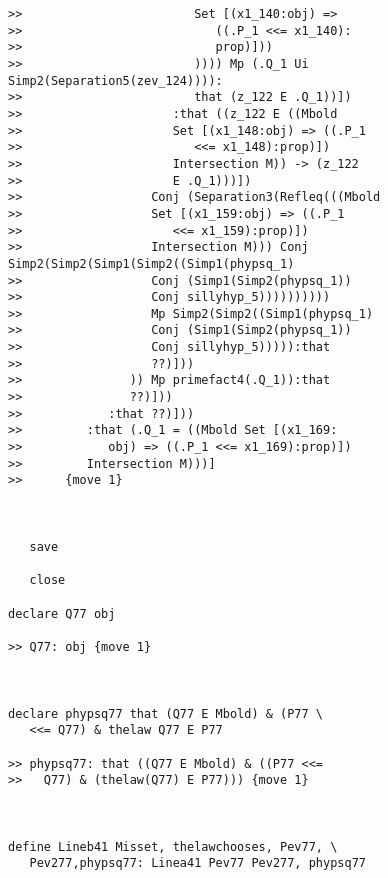 \documentclass[12pt]{article}
\begin{document}
\begin{verbatim}
>>                        Set [(x1_140:obj) =>
>>                           ((.P_1 <<= x1_140):
>>                           prop)]))
>>                        )))) Mp (.Q_1 Ui Simp2(Separation5(zev_124)))):
>>                        that (z_122 E .Q_1))])
>>                     :that ((z_122 E ((Mbold
>>                     Set [(x1_148:obj) => ((.P_1
>>                        <<= x1_148):prop)])
>>                     Intersection M)) -> (z_122
>>                     E .Q_1)))])
>>                  Conj (Separation3(Refleq(((Mbold
>>                  Set [(x1_159:obj) => ((.P_1
>>                     <<= x1_159):prop)])
>>                  Intersection M))) Conj Simp2(Simp2(Simp1(Simp2((Simp1(phypsq_1)
>>                  Conj (Simp1(Simp2(phypsq_1))
>>                  Conj sillyhyp_5))))))))))
>>                  Mp Simp2(Simp2((Simp1(phypsq_1)
>>                  Conj (Simp1(Simp2(phypsq_1))
>>                  Conj sillyhyp_5))))):that
>>                  ??)]))
>>               )) Mp primefact4(.Q_1)):that
>>               ??)]))
>>            :that ??)]))
>>         :that (.Q_1 = ((Mbold Set [(x1_169:
>>            obj) => ((.P_1 <<= x1_169):prop)])
>>         Intersection M)))]
>>      {move 1}



   save

   close

declare Q77 obj

>> Q77: obj {move 1}



declare phypsq77 that (Q77 E Mbold) & (P77 \
   <<= Q77) & thelaw Q77 E P77

>> phypsq77: that ((Q77 E Mbold) & ((P77 <<=
>>   Q77) & (thelaw(Q77) E P77))) {move 1}



define Lineb41 Misset, thelawchooses, Pev77, \
   Pev277,phypsq77: Linea41 Pev77 Pev277, phypsq77



\end{verbatim}
\end{document}
